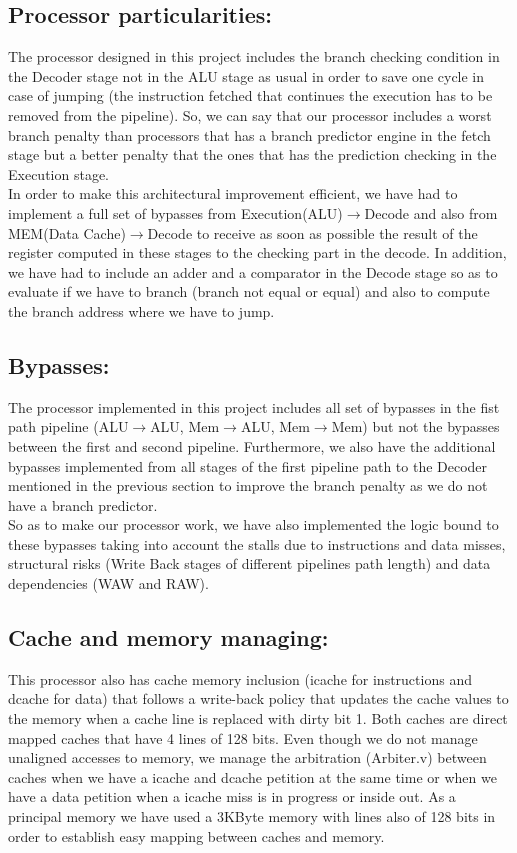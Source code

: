 \documentclass{article}
\begin{document}
\subsection{Processor particularities:}
The processor designed in this project includes the branch checking condition in the Decoder stage not in the ALU stage as usual in order to save one cycle in case of jumping (the instruction fetched that continues the execution has to be removed from the pipeline). So, we can say that our processor includes a worst branch penalty than processors that has a branch predictor engine in the fetch stage but a better penalty that the ones that has the prediction checking in the Execution stage.\\
In order to make this architectural improvement efficient, we have had to implement a full set of bypasses from Execution(ALU)$\rightarrow$Decode and also from MEM(Data Cache)$\rightarrow$Decode to receive as soon as possible the result of the register computed in these stages to the checking part in the decode. In addition, we have had to include an adder and a comparator in the Decode stage so as to evaluate if we have to branch (branch not equal or equal) and also to compute the branch address where we have to jump.

\subsection{Bypasses:}
The processor implemented in this project includes all set of bypasses in the fist path pipeline (ALU$\rightarrow$ALU, Mem$\rightarrow$ALU, Mem$\rightarrow$Mem) but not the bypasses between the first and second pipeline. Furthermore, we also have the additional bypasses implemented from all stages of the first pipeline path to the Decoder mentioned in the previous section to improve the branch penalty as we do not have a branch predictor.\\
So as to make our processor work, we have also implemented the logic bound to these bypasses taking into account the stalls due to instructions and data misses, structural risks (Write Back stages of different pipelines path length) and data dependencies (WAW and RAW).

\subsection{Cache and memory managing:}
This processor also has cache memory inclusion (icache for instructions and dcache for data) that follows a write-back policy that updates the cache values to the memory when a cache line is replaced with dirty bit 1. Both caches are direct mapped caches that have 4 lines of 128 bits. Even though we do not manage unaligned accesses to memory, we manage the arbitration (Arbiter.v) between caches when we have a icache and dcache petition at the same time or when we have a data petition when a icache miss is in progress or inside out. As a principal memory we have used a 3KByte memory with lines also of 128 bits in order to establish easy mapping between caches and memory.\\
\end{document}
